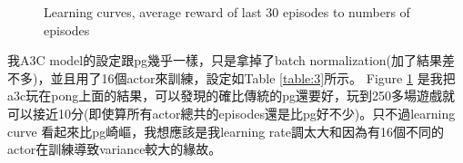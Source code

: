 \documentclass[12pt, a4paper]{article}
\begin{document}
\begin{CJK}{UTF8}{bkai}
\begin{figure}[!htb]
\centering
{}
\hfill
{}
\hfill
\caption{Learning curves, average reward of last 30 episodes to numbers of episodes}
\label{fig:f12}
\end{figure}
\noindent
我A3C model的設定跟pg幾乎一樣，只是拿掉了batch normalization(加了結果差不多)，並且用了16個actor來訓練，設定如Table \ref{table:3}所示。
Figure \ref{fig:f12} 是我把a3c玩在pong上面的結果，可以發現的確比傳統的pg還要好，玩到250多場遊戲就可以接近10分(即使算所有actor總共的episodes還是比pg好不少)。只不過learning curve 看起來比pg崎嶇，我想應該是我learning rate調太大和因為有16個不同的actor在訓練導致variance較大的緣故。


\end{CJK}
\end{document}
